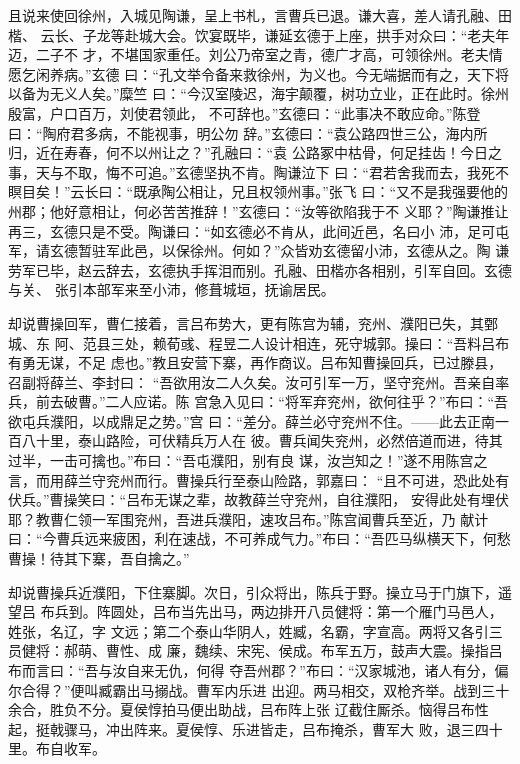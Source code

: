 且说来使回徐州，入城见陶谦，呈上书札，言曹兵已退。谦大喜，差人请孔融、田楷、
云长、子龙等赴城大会。饮宴既毕，谦延玄德于上座，拱手对众曰：“老夫年迈，二子不
才，不堪国家重任。刘公乃帝室之青，德广才高，可领徐州。老夫情愿乞闲养病。”玄德
曰：“孔文举令备来救徐州，为义也。今无端据而有之，天下将以备为无义人矣。”糜竺
曰：“今汉室陵迟，海宇颠覆，树功立业，正在此时。徐州殷富，户口百万，刘使君领此，
不可辞也。”玄德曰：“此事决不敢应命。”陈登曰：“陶府君多病，不能视事，明公勿
辞。”玄德曰：“袁公路四世三公，海内所归，近在寿春，何不以州让之？”孔融曰：“袁
公路冢中枯骨，何足挂齿！今日之事，天与不取，悔不可追。”玄德坚执不肯。陶谦泣下
曰：“君若舍我而去，我死不瞑目矣！”云长曰：“既承陶公相让，兄且权领州事。”张飞
曰：“又不是我强要他的州郡；他好意相让，何必苦苦推辞！”玄德曰：“汝等欲陷我于不
义耶？”陶谦推让再三，玄德只是不受。陶谦曰：“如玄德必不肯从，此间近邑，名曰小
沛，足可屯军，请玄德暂驻军此邑，以保徐州。何如？”众皆劝玄德留小沛，玄德从之。陶
谦劳军已毕，赵云辞去，玄德执手挥泪而别。孔融、田楷亦各相别，引军自回。玄德与关、
张引本部军来至小沛，修葺城垣，抚谕居民。

却说曹操回军，曹仁接着，言吕布势大，更有陈宫为辅，兖州、濮阳已失，其鄄城、东
阿、范县三处，赖荀彧、程昱二人设计相连，死守城郭。操曰：“吾料吕布有勇无谋，不足
虑也。”教且安营下寨，再作商议。吕布知曹操回兵，已过滕县，召副将薛兰、李封曰：
“吾欲用汝二人久矣。汝可引军一万，坚守兖州。吾亲自率兵，前去破曹。”二人应诺。陈
宫急入见曰：“将军弃兖州，欲何往乎？”布曰：“吾欲屯兵濮阳，以成鼎足之势。”宫
曰：“差分。薛兰必守兖州不住。——此去正南一百八十里，泰山路险，可伏精兵万人在
彼。曹兵闻失兖州，必然倍道而进，待其过半，一击可擒也。”布曰：“吾屯濮阳，别有良
谋，汝岂知之！”遂不用陈宫之言，而用薛兰守兖州而行。曹操兵行至泰山险路，郭嘉曰：
“且不可进，恐此处有伏兵。”曹操笑曰：“吕布无谋之辈，故教薛兰守兖州，自往濮阳，
安得此处有埋伏耶？教曹仁领一军围兖州，吾进兵濮阳，速攻吕布。”陈宫闻曹兵至近，乃
献计曰：“今曹兵远来疲困，利在速战，不可养成气力。”布曰：“吾匹马纵横天下，何愁
曹操！待其下寨，吾自擒之。”

却说曹操兵近濮阳，下住寨脚。次日，引众将出，陈兵于野。操立马于门旗下，遥望吕
布兵到。阵圆处，吕布当先出马，两边排开八员健将：第一个雁门马邑人，姓张，名辽，字
文远；第二个泰山华阴人，姓臧，名霸，字宣高。两将又各引三员健将：郝萌、曹性、成
廉，魏续、宋宪、侯成。布军五万，鼓声大震。操指吕布而言曰：“吾与汝自来无仇，何得
夺吾州郡？”布曰：“汉家城池，诸人有分，偏尔合得？”便叫臧霸出马搦战。曹军内乐进
出迎。两马相交，双枪齐举。战到三十余合，胜负不分。夏侯惇拍马便出助战，吕布阵上张
辽截住厮杀。恼得吕布性起，挺戟骤马，冲出阵来。夏侯惇、乐进皆走，吕布掩杀，曹军大
败，退三四十里。布自收军。

